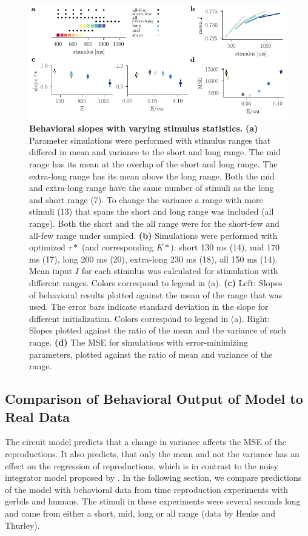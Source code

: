\documentclass[10pt]{article}
\begin{document}
\begin{figure}[ht]
	\centering
	\includegraphics{figures/ranges_new2.pdf}
	\caption{\textbf{Behavioral slopes with varying stimulus statistics.} 
	\textbf{(a)} Parameter simulations were performed with stimulus ranges that differed in mean and variance to the short and long range. The mid range has its mean at the overlap of the short and long range. The extra-long range has its mean above the long range. Both the mid and extra-long range have the same number of stimuli as the long and short range (7). To change the variance a range with more stimuli (13) that spans the short and long range was included (all range). Both the short and the all range were for the short-few and all-few range under sampled.
	\textbf{(b)} Simulations were performed with optimized $\tau*$ (and corresponding  $K*$): short 130 ms (14), mid 170 ms (17), long 200 ms (20), extra-long 230 ms (18), all 150 ms (14). Mean input $I$ for each stimulus was calculated for stimulation with different ranges. Colors correspond to legend in (a). 
	\textbf{(c)} Left: Slopes of behavioral results plotted against the mean of the range that was used. The error bars indicate standard deviation in the slope for different initialization. Colors correspond to legend in (a).
	Right: Slopes plotted against the ratio of the mean and the variance of each range. 
	\textbf{(d)} The MSE for simulations with error-minimizing parameters, plotted against the ratio of mean and variance of the range.
	}
\label{fig:new_ranges}
\end{figure}

\subsection{Comparison of Behavioral Output of Model to Real Data}
The circuit model predicts that a change in variance affects the MSE  of the reproductions.
It also predicts, that only the mean and not the variance has an effect on the regression of reproductions, which is in contrast to the noisy integrator model proposed by \cite{Thurley2016}.
In the following section, we compare predictions of the model with behavioral data from time reproduction experiments with gerbils and humans. The stimuli in these experiments were several seconds long and came from either a short, mid, long or all range (data by Henke and Thurley).
\end{document}
